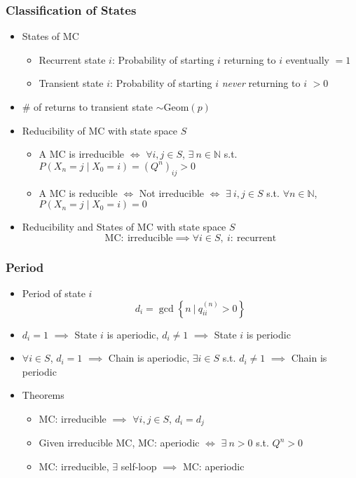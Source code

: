 \subsubsection*{Classification of States}
\begin{itemize}
    \item States of MC
    \begin{itemize}
        \item Recurrent state $i$: Probability of starting $i$ returning to $i$ eventually $=1$
        \item Transient state $i$: Probability of starting $i$ \textit{never} returning to $i$ $>0$
    \end{itemize}
    \item \# of returns to transient state $\sim\text{Geom}(p)$
    \item Reducibility of MC with state space $S$
    \begin{itemize}
        \item A MC is irreducible $\iff$ $\forall i,j\in S$, $\exists~n\in\mathbb{N}$ s.t. $P(X_n=j\mid X_0=i)=(Q^n)_{ij}>0$
        \item A MC is reducible $\iff$ Not irreducible $\iff$ $\exists~i,j\in S$ s.t. $\forall n\in\mathbb{N}$, $P(X_n=j\mid X_0=i)=0$
    \end{itemize}
    \item Reducibility and States of MC with state space $S$
    \begin{equation}
        \text{MC}:~\text{irreducible}\implies\forall i\in S,~i:~\text{recurrent}
    \end{equation}
\end{itemize}

\subsubsection*{Period}
\begin{itemize}
    \item Period of state $i$
    \begin{equation}
        d_i=\gcd\left\{n~\Big|~q_{ii}^{(n)}>0\right\}
    \end{equation}
    \item $d_i=1$ $\implies$ State $i$ is aperiodic, $d_i\neq 1$ $\implies$ State $i$ is periodic
    \item $\forall i\in S$, $d_i=1$ $\implies$ Chain is aperiodic, $\exists i\in S$ s.t. $d_i\neq 1$ $\implies$ Chain is periodic
    \item Theorems
    \begin{itemize}
        \item MC: irreducible $\implies$ $\forall i,j\in S$, $d_i=d_j$
        \item Given irreducible MC, MC: aperiodic $\iff$ $\exists~n>0$ s.t. $Q^n>0$
        \item MC: irreducible, $\exists$ self-loop $\implies$ MC: aperiodic
    \end{itemize}
\end{itemize}

